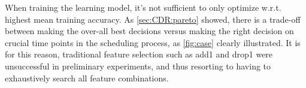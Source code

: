 \documentclass[smallextended]{svjour3}
\begin{document}
	When training the learning model, it's not sufficient to only optimize w.r.t. highest mean training accuracy. As \cref{sec:CDR:pareto} showed, there is a trade-off between making the over-all best decisions versus making the right decision on crucial time points in the scheduling process, as \cref{fig:case} clearly illustrated. It is for this reason, traditional feature selection such as add1 and drop1 were unsuccessful in preliminary experiments, and thus resorting to having to exhaustively search all feature combinations.
	
	
	
	  
	
	
	
\end{document}
